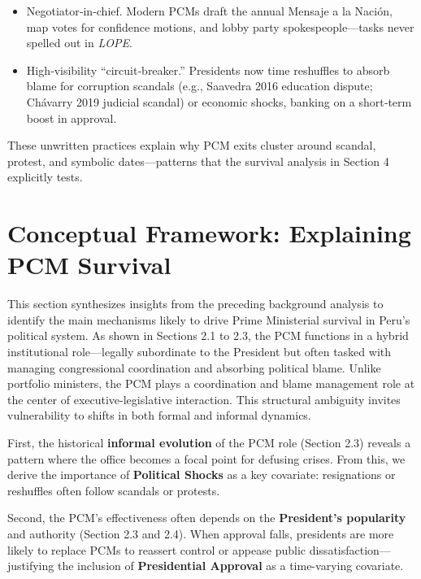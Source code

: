 \documentclass[a4paper, 12pt]{article}
\begin{document}
\begin{itemize}
\item Negotiator‑in‑chief. Modern PCMs draft the annual Mensaje a la Nación, map votes for confidence motions, and lobby party spokespeople—tasks never spelled out in \emph{LOPE}.

\item High‑visibility “circuit‑breaker.” Presidents now time reshuffles to absorb blame for corruption scandals (e.g., Saavedra 2016 education dispute; Chávarry 2019 judicial scandal) or economic shocks, banking on a short‑term boost in approval.

\end{itemize}


These unwritten practices explain why PCM exits cluster around scandal, protest, and symbolic dates—patterns that the survival analysis in Section 4 explicitly tests.





\section{Conceptual Framework: Explaining PCM Survival}\label{concepframe}

This section synthesizes insights from the preceding background analysis to identify the main mechanisms likely to drive Prime Ministerial survival in Peru's political system. As shown in Sections 2.1 to 2.3, the PCM functions in a hybrid institutional role—legally subordinate to the President but often tasked with managing congressional coordination and absorbing political blame. Unlike portfolio ministers, the PCM plays a coordination and blame management role at the center of executive-legislative interaction. This structural ambiguity invites vulnerability to shifts in both formal and informal dynamics.

First, the historical \textbf{informal evolution} of the PCM role (Section 2.3) reveals a pattern where the office becomes a focal point for defusing crises. From this, we derive the importance of \textbf{Political Shocks} as a key covariate: resignations or reshuffles often follow scandals or protests.

Second, the PCM’s effectiveness often depends on the \textbf{President's popularity} and authority (Section 2.3 and 2.4). When approval falls, presidents are more likely to replace PCMs to reassert control or appease public dissatisfaction---justifying the inclusion of \textbf{Presidential Approval} as a time-varying covariate.
\end{document}

